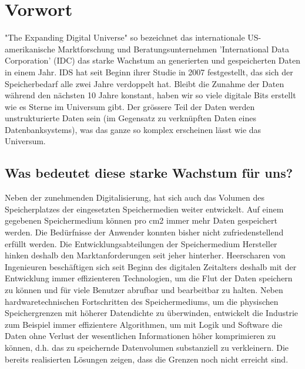 
\cleardoublepage
\chapter{Vorwort}
"The Expanding Digital Universe" so bezeichnet das internationale US-amerikanische Marktforschung und Beratungsunternehmen 'International Data Corporation' (\ac{IDC}) das starke Wachstum an generierten und gespeicherten Daten in einem Jahr. IDS hat seit Beginn ihrer Studie in 2007 festgestellt, das sich der Speicherbedarf alle zwei Jahre verdoppelt hat. Bleibt die Zunahme der Daten während den nächsten 10 Jahre konstant, haben wir so viele digitale Bits erstellt wie es Sterne im Universum gibt. Der grössere Teil der Daten werden unstrukturierte Daten sein (im Gegensatz zu verknüpften Daten eines Datenbanksystems), was das ganze so komplex erscheinen lässt wie das Universum.\cite{IDC}

\section{Was bedeutet diese starke Wachstum für uns?}
Neben der zunehmenden Digitalisierung, hat sich auch das Volumen des Speicherplatzes der eingesetzten Speichermedien weiter entwickelt. Auf einem gegebenen Speichermedium können pro cm2 immer mehr Daten gespeichert werden. Die Bedürfnisse der Anwender konnten bisher nicht zufriedenstellend erfüllt werden. Die Entwicklungsabteilungen der Speichermedium Hersteller hinken deshalb den Marktanforderungen seit jeher hinterher. Heerscharen von Ingenieuren beschäftigen sich seit Beginn des digitalen Zeitalters deshalb mit der Entwicklung immer effizienteren Technologien, um die Flut der Daten speichern zu können und für viele Benutzer abrufbar und bearbeitbar zu halten. Neben hardwaretechnischen Fortschritten des Speichermediums, um die physischen Speichergrenzen mit höherer Datendichte zu überwinden, entwickelt die Industrie zum Beispiel immer effizientere Algorithmen, um mit Logik und Software die Daten ohne Verlust der wesentlichen Informationen höher komprimieren zu können, d.h. das zu speichernde Datenvolumen substanziell zu verkleinern. Die bereits realisierten Lösungen zeigen, dass die Grenzen noch nicht erreicht sind.

